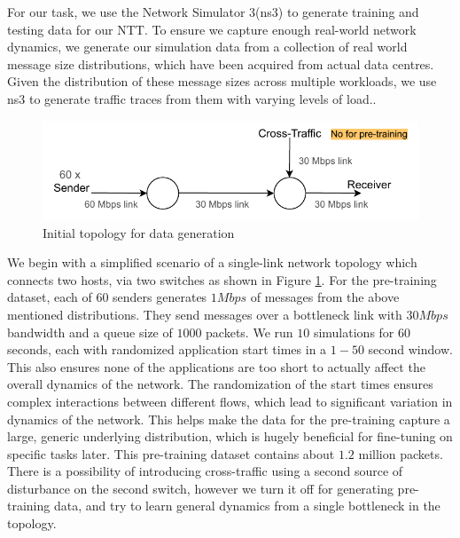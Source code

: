 For our task, we use the Network Simulator 3(ns3)\cite{ns3} to generate training and testing data for our NTT. To ensure we capture enough real-world network dynamics, we generate our simulation data from a collection of real world message size distributions, which have been acquired from actual data centres. Given the distribution of these message sizes across multiple workloads, we use ns3 to generate traffic traces from them with varying levels of load.\cite{homa}.

\begin{figure}[h]
  \begin{center}
    \includegraphics[scale=1.2]{figures/simple_topo.pdf}
    \caption{Initial topology for data generation}
    \label{fig:topo}
  \end{center}
\end{figure}

We begin with a simplified scenario of a single-link network topology which connects two hosts, via two switches as shown in Figure \ref{fig:topo}. For the pre-training dataset, each of $60$ senders generates $1Mbps$ of messages from the above mentioned distributions. They send messages over a bottleneck link with $30Mbps$ bandwidth and a queue size of $1000$ packets. We run $10$ simulations for $60$ seconds, each with randomized application start times in a $1-50$ second window. This also ensures none of the applications are too short to actually affect the overall dynamics of the network. The randomization of the start times ensures complex interactions between different flows, which lead to significant variation in dynamics of the network. This helps make the data for the pre-training capture a large, generic underlying distribution, which is hugely beneficial for fine-tuning on specific tasks later. This pre-training dataset contains about $1.2$ million packets. There is a possibility of introducing cross-traffic using a second source of disturbance on the second switch, however we turn it off for generating pre-training data, and try to learn general dynamics from a single bottleneck in the topology.

